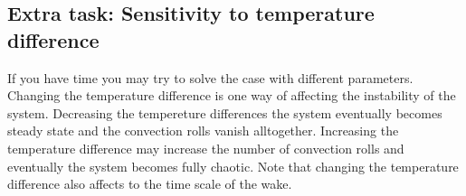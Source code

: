 \subsection*{Extra task: Sensitivity to temperature difference}

If you have time you may try to solve the case with different parameters. Changing the temperature difference
is one way of affecting the instability of the system. Decreasing the tempereture differences the system eventually becomes 
steady state and the convection rolls vanish alltogether. Increasing the temperature difference may increase the 
number of convection rolls and eventually the system becomes fully chaotic. Note that changing the temperature difference
also affects to the time scale of the wake. 

\hfill

